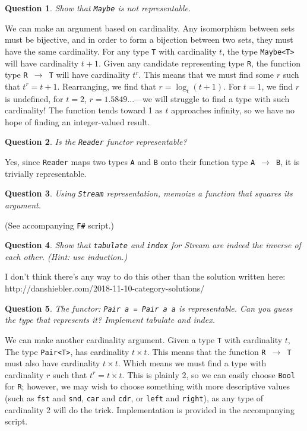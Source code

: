\documentclass{article}
\newtheorem{question}{Question}
\begin{document}
    \begin{question}
        Show that \texttt{Maybe} is not representable.
    \end{question}
    We can make an argument based on cardinality. Any isomorphism between sets must be bijective, 
    and in order to form a bijection between two sets, they must have the same 
    cardinality. For any type \texttt{T} with cardinality $t$, the type \texttt{Maybe<T>} will have 
    cardinality $t+1$. Given any candidate representing type \texttt{R}, the function type \texttt
    {R $\to$ T} will have cardinality $t^r$. This means that we must find some $r$ such that $t^r = 
    t+1$. Rearranging, we find that $r = \log_t (t+1)$. For $t=1$, we find $r$ is undefined, for 
    $t=2$, $r = 1.5849...$---we will struggle to find a type with such cardinality! The function 
    tends toward 1 as $t$ approaches infinity, so we have no hope of finding an integer-valued 
    result.

    \pagebreak

    \begin{question}
        Is the \texttt{Reader} functor representable?
    \end{question}
    Yes, since \texttt{Reader} maps two types \texttt{A} and \texttt{B} onto their function type 
    \texttt{A $\to$ B}, it is trivially representable.

    \begin{question}
        Using \texttt{Stream} representation, memoize a function that squares its argument.
    \end{question}
    (See accompanying \texttt{F\#} script.)

    \begin{question}
        Show that \texttt{tabulate} and \texttt{index} for Stream are indeed the inverse of each 
        other. (Hint: use induction.)
    \end{question}

    I don't think there's any way to do this other than the solution written here:\\
    http://danshiebler.com/2018-11-10-category-solutions/

    \begin{question}
        The functor: \texttt{Pair a = Pair a a} is representable. Can you guess the type that 
        represents it? Implement tabulate and index.
    \end{question}

    We can make another cardinality argument. Given a type \texttt{T} with cardinality $t$, The 
    type \texttt{Pair<T>}, has cardinality $t \times t$. This means that the function \texttt{R 
    $\to$ T} must also have cardinality $t \times t$. Which means we must find a type with 
    cardinality $r$ such that $t^r = t \times t$. This is plainly 2, so we can easily choose \texttt
    {Bool} for \texttt{R}; however, we may wish to choose something with more descriptive values 
    (such as \texttt{fst} and \texttt{snd}, \texttt{car} and \texttt{cdr}, or \texttt{left} and 
    \texttt{right}), as any type of cardinality 2 will do the trick. Implementation is provided in
    the accompanying script.
\end{document}
